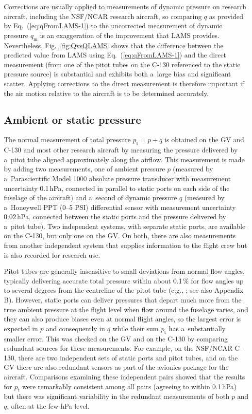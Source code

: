 \documentclass[amtd, online, hvmath]{copernicus}
\begin{document}
Corrections are usually applied to measurements of dynamic pressure on
research aircraft, including the NSF/NCAR research aircraft, so
comparing $q$ as provided by Eq.~(\ref{eq:qFromLAMS-1}) to the
uncorrected measurement of dynamic pressure $q_{\mathrm{m}}$ is an exaggeration
of the improvement that LAMS provides. Nevertheless,
Fig.~\ref{fig:QvsQLAMS} shows that the difference between the
predicted value from LAMS using Eq.~(\ref{eq:qFromLAMS-1}) and the
direct measurement (from one of the pitot tubes on the C-130
referenced to the static pressure source) is substantial and exhibits
both a~large bias and significant scatter. Applying corrections to the
direct measurement is therefore important if the air motion relative
to the aircraft is to be determined accurately.

\subsection{Ambient or static pressure}

The normal measurement of total pressure $p_{\mathrm{t}}=p+q$ is
obtained on the GV and C-130 and most other research aircraft by
measuring the pressure delivered by a~pitot tube aligned approximately
along the airflow. This measurement is made by adding two
measurements, one of ambient pressure $p$ (measured by
a~Parascientific Model 1000 absolute pressure transducer with
measurement uncertainty 0.1\,hPa, connected in parallel to static
ports on each side of the fuselage of the aircraft) and a~second of
dynamic pressure $q$ (measured by a~Honeywell PPT (0--5 PSI)
differential sensor with measurement uncertainty 0.02\,hPa, connected
between the static ports and the pressure delivered by a~pitot
tube). Two independent systems, with separate static ports, are
available on the C-130, but only one on the GV. On both, there are
also measurements from another independent system that supplies
information to the flight crew but is also recorded for research use.

Pitot tubes are generally insensitive to small deviations from normal
flow angles, typically delivering accurate total pressure within about
0.1\,{\%} for flow angles up to several degrees from the centreline of
the pitot tube (e.g.,
\citealp{NACATN2331,balachandran2006fundamentals,springerhdbk2007};
see also Appendix B). However, static ports can deliver pressures that
depart much more from the true ambient pressure at the flight level
when flow around the fuselage varies, and they can also produce biases
even at normal flight angles, so the largest error is expected in $p$
and consequently in $q$ while their sum $p_{\mathrm{t}}$ has
a~substantially smaller error. This was checked on the GV and on the
C-130 by comparing redundant sources for these measurements. For
example, on the NSF/NCAR C-130, there are two independent sets of
static ports and pitot tubes, and on the GV there are also redundant
sensors as part of the avionics package for the aircraft.  Comparisons
examining these independent pairs showed that the results for
$p_{\mathrm{t}}$ were remarkably consistent among all pairs (agreeing
to within 0.1\,hPa) but there was significant variability in the
redundant measurements of both $p$ and $q$, often at the few-hPa
level.
\end{document}
